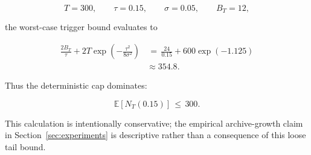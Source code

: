 \documentclass{article} %
\begin{document}
\begin{equation}
\label{eq:app-six-trigger-example-constants}
T=300,
\qquad
\tau=0.15,
\qquad
\sigma=0.05,
\qquad
B_T=12,
\end{equation}

the worst-case trigger bound evaluates to

\begin{align}
\label{eq:app-six-trigger-example-eval}
\frac{2B_T}{\tau}
+
2T\exp\!\left(-\frac{\tau^2}{8\sigma^2}\right)
&\,=\,
\frac{24}{0.15}
+
600\exp(-1.125)
\\
&\approx
354.8.
\end{align}

Thus the deterministic cap dominates:

\begin{equation}
\label{eq:app-six-trigger-example-cap}
\mathbb{E}[N_T(0.15)]
\,\le\,
300.
\end{equation}

This calculation is intentionally conservative; the empirical archive-growth claim in Section~\ref{sec:experiments} is descriptive rather than a consequence of this loose tail bound.
\end{document}
